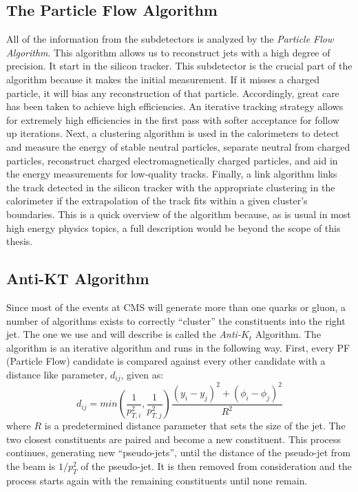 \subsection{The Particle Flow Algorithm}
All of the information from the subdetectors is analyzed by the \textit{Particle Flow Algorithm}. This algorithm allows us to reconstruct jets with a high degree of precision.
It start in the silicon tracker. This subdetector is the crucial part of the algorithm because it makes the initial measurement. If it misses a charged particle, it will bias any reconstruction of that particle. 
Accordingly, great care has been taken to achieve high efficiencies. An iterative tracking strategy allows for extremely high efficiencies in the first pass with softer acceptance for follow up iterations. 
Next, a clustering algorithm is used in the calorimeters to detect and measure the energy of stable neutral particles, separate neutral from charged particles, reconstruct charged electromagnetically charged particles, and aid in the energy measurements for low-quality tracks.
Finally, a link algorithm links the track detected in the silicon tracker with the appropriate clustering in the calorimeter if the extrapolation of the track fits within a given cluster's boundaries.
This is a quick overview of the algorithm because, as is usual in most high energy physics topics, a full description would be beyond the scope of this thesis.

\subsection{Anti-KT Algorithm}

Since most of the events at CMS will generate more than one quarks or gluon, a number of algorithms exists to correctly ``cluster'' the constituents into the right jet.
The one we use and will describe is called the \textit{Anti-$K_t$} Algorithm. The algorithm is an iterative algorithm and runs in the following way.
First, every PF (Particle Flow) candidate is compared against every other candidate with a distance like parameter, $d_{ij}$, given as:
\begin{equation}
   d_{ij} = min(\frac{1}{p_{T,i}^2},\frac{1}{p_{T,j}^2}) \frac{(y_i - y_j)^2+(\phi_i - \phi_j)^2}{R^2}
\end{equation}
where $R$ is a predetermined distance parameter that sets the size of the jet. The two closest constituents are paired and become a new constituent.
This process continues, generating new ``pseudo-jets'', until the distance of the pseudo-jet from the beam is $1/p_T^2$ of the pseudo-jet. It is then removed from consideration and the process starts again with the remaining constituents until none remain.

